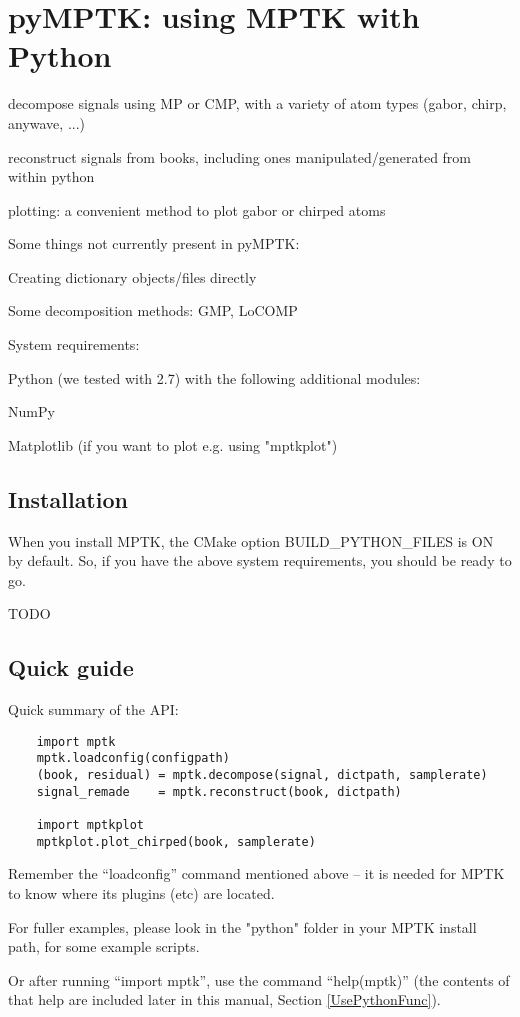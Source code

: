 \chapter{pyMPTK: using MPTK with Python \label{GettingStartedPython}}

\begin{my_itemize}
\item decompose signals using MP or CMP, with a variety of atom types (gabor, chirp, anywave, ...)
\item reconstruct signals from books, including ones manipulated/generated from within python
\item plotting: a convenient method to plot gabor or chirped atoms
\end{my_itemize}

Some things not currently present in pyMPTK:
\begin{my_itemize}
\item Creating dictionary objects/files directly
\item Some decomposition methods: GMP, LoCOMP
\end{my_itemize}

System requirements:
\begin{my_itemize}
	\item Python (we tested with 2.7) with the following additional modules:
\begin{my_itemize}
\item NumPy
\item Matplotlib (if you want to plot e.g. using "mptkplot")
\end{my_itemize}
\end{my_itemize}

\section{Installation}

When you install MPTK, the CMake option BUILD\_PYTHON\_FILES is ON by default.
So, if you have the above system requirements, you should be ready to go.

TODO

\section{Quick guide}
Quick summary of the API:

\begin{verbatim}
	import mptk
	mptk.loadconfig(configpath)
	(book, residual) = mptk.decompose(signal, dictpath, samplerate)
	signal_remade    = mptk.reconstruct(book, dictpath)

	import mptkplot
	mptkplot.plot_chirped(book, samplerate)
\end{verbatim}

Remember the ``loadconfig'' command mentioned above -- it is needed for MPTK
to know where its plugins (etc) are located.

For fuller examples, please look in the "python" folder in your MPTK install path, for some example scripts.

Or after running ``import mptk'', use the command ``help(mptk)''
(the contents of that help are included later in this manual, Section \ref{UsePythonFunc}).


